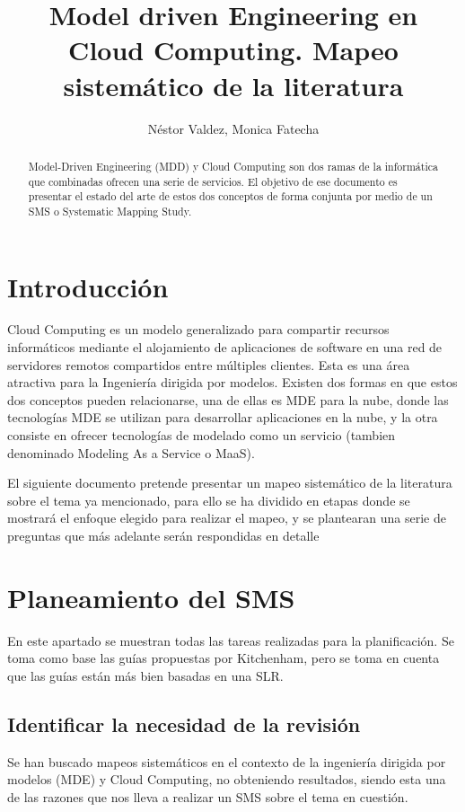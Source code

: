 \documentclass{llncs}
\begin{document}
\title{Model driven Engineering en Cloud Computing. Mapeo sistemático de la literatura}

\author{Néstor Valdez, Monica Fatecha}
\maketitle

\begin{abstract}
Model-Driven Engineering (MDD) y Cloud Computing son dos ramas de la informática que combinadas ofrecen una serie de servicios. El objetivo de ese documento
es presentar el estado del arte de estos dos conceptos de forma conjunta por medio de un SMS o Systematic Mapping Study.
\end{abstract}

\section{Introducción}\label{sec:Introduction}
Cloud Computing es un modelo generalizado para compartir recursos informáticos mediante el alojamiento de aplicaciones
de software en una red de servidores remotos compartidos entre múltiples clientes. Esta es una área atractiva para la Ingeniería
dirigida por modelos. Existen dos formas en que estos dos conceptos pueden relacionarse, una de ellas es MDE para la nube, donde las
tecnologías MDE se utilizan para desarrollar aplicaciones en la nube, y la otra consiste en ofrecer tecnologías de modelado como un servicio
(tambien denominado Modeling As a Service o MaaS).

El siguiente documento pretende presentar un mapeo sistemático de la literatura sobre el tema ya mencionado, para ello se ha dividido
en etapas donde se mostrará el enfoque elegido para realizar el mapeo, y se plantearan una serie de preguntas que más adelante serán respondidas en detalle

\section{Planeamiento del SMS}\label{sec:Planning}
En este apartado se muestran todas las tareas realizadas para la planificación. Se toma como base las guías propuestas por
Kitchenham\cite{slr}, pero se toma en cuenta que las guías están más bien basadas en una SLR.
\subsection{Identificar la necesidad de la revisión}
Se han buscado mapeos sistemáticos en el contexto de la ingeniería dirigida por modelos (MDE) y Cloud Computing, no obteniendo
resultados, siendo esta una de las razones que nos lleva a realizar un SMS sobre el tema en cuestión.
\end{document}
